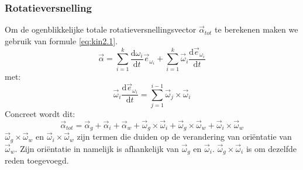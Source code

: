 \subsubsection{Rotatieversnelling}
Om de ogenblikkelijke totale rotatieversnellingsvector $\vec{\alpha}_{tot}$ te berekenen maken we gebruik van formule \eqref{eq:kin2.1}.
\begin{equation}
\vec{\alpha} = \sum_{i=1}^{k}{\frac{\mathrm{d}\omega_{i}}{\mathrm{d}t}\vec{e}_{\omega_{i}}}+\sum_{i=1}^{k}{\vec{\omega}_{i}\frac{\mathrm{d}\vec{e}_{\omega_{i}}}{\mathrm{d}t}}  
\label{eq:kin2.1}
\end{equation}
met:
\begin{equation}
\vec{\omega}_{i}\frac{\mathrm{d}\vec{e}_{\omega_{i}}}{\mathrm{d}t}=\sum_{j=1}^{i-1}{\vec{\omega}_{j}\times\vec{\omega}_{i}}  
\label{eq:kin2.2}
\end{equation}
Concreet wordt dit:
\begin{equation}
\vec{\alpha}_{tot} = \vec{\alpha}_{g} + \vec{\alpha}_{i} + \vec{\alpha}_{w} + \vec{\omega}_{g} \times \vec{\omega}_{i} + \vec{\omega}_{g} \times \vec{\omega}_{w} + \vec{\omega}_{i} \times \vec{\omega}_{w}
\label{eq:kin2.3}
\end{equation}
$\vec{\omega}_{g} \times \vec{\omega}_{w}$ en $\vec{\omega}_{i} \times \vec{\omega}_{w}$ zijn termen die duiden op de verandering van oriëntatie van $\vec{\omega}_{w}$. Zijn oriëntatie in namelijk is afhankelijk van $\vec{\omega}_{g}$ en $\vec{\omega}_{i}$. $\vec{\omega}_{g} \times \vec{\omega}_{i}$ is om dezelfde reden toegevoegd.

